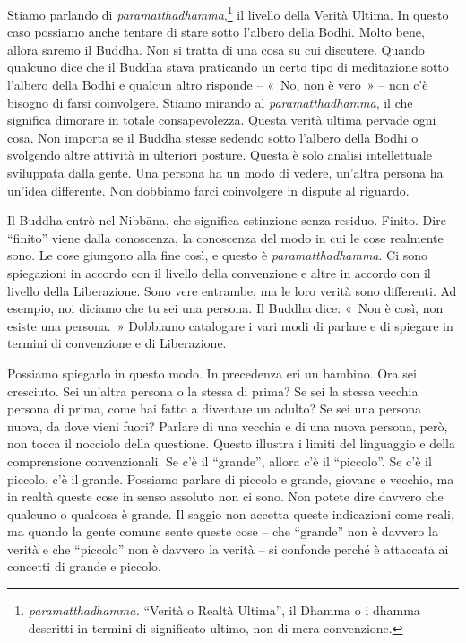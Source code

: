 Stiamo parlando di \emph{paramatthadhamma},\footnote{\emph{paramatthadhamma.}
  ``Verità o Realtà Ultima'', il Dhamma o i dhamma descritti in
  termini di significato ultimo, non di mera convenzione.} il livello
della Verità Ultima. In questo caso possiamo anche tentare di stare
sotto l'albero della Bodhi. Molto bene, allora saremo il Buddha. Non si
tratta di una cosa su cui discutere. Quando qualcuno dice che il Buddha
stava praticando un certo tipo di meditazione sotto l'albero della Bodhi
e qualcun altro risponde -- «~No, non è vero~» -- non c'è bisogno di
farsi coinvolgere. Stiamo mirando al \emph{paramatthadhamma}, il che
significa dimorare in totale consapevolezza. Questa verità ultima
pervade ogni cosa. Non importa se il Buddha stesse sedendo sotto
l'albero della Bodhi o svolgendo altre attività in ulteriori posture.
Questa è solo analisi intellettuale sviluppata dalla gente. Una persona
ha un modo di vedere, un'altra persona ha un'idea differente. Non
dobbiamo farci coinvolgere in dispute al riguardo.

Il Buddha entrò nel Nibbāna, che significa estinzione senza
residuo. Finito. Dire ``finito'' viene dalla conoscenza, la conoscenza
del modo in cui le cose realmente sono. Le cose giungono alla fine così,
e questo è \emph{paramatthadhamma}. Ci sono spiegazioni in accordo con
il livello della convenzione e altre in accordo con il livello della
Liberazione. Sono vere entrambe, ma le loro verità sono differenti. Ad
esempio, noi diciamo che tu sei una persona. Il Buddha dice: «~Non è
così, non esiste una persona.~» Dobbiamo catalogare i vari modi di
parlare e di spiegare in termini di convenzione e di Liberazione.

Possiamo spiegarlo in questo modo. In precedenza eri un bambino. Ora sei
cresciuto. Sei un'altra persona o la stessa di prima? Se sei la stessa
vecchia persona di prima, come hai fatto a diventare un adulto? Se sei
una persona nuova, da dove vieni fuori? Parlare di una vecchia e di una
nuova persona, però, non tocca il nocciolo della questione. Questo
illustra i limiti del linguaggio e della comprensione convenzionali. Se
c'è il ``grande'', allora c'è il ``piccolo''. Se c'è il piccolo, c'è il
grande. Possiamo parlare di piccolo e grande, giovane e vecchio, ma in
realtà queste cose in senso assoluto non ci sono. Non potete dire
davvero che qualcuno o qualcosa è grande. Il saggio non accetta queste
indicazioni come reali, ma quando la gente comune sente queste cose --
che ``grande'' non è davvero la verità e che ``piccolo'' non è davvero
la verità -- si confonde perché è attaccata ai concetti di grande e
piccolo.

